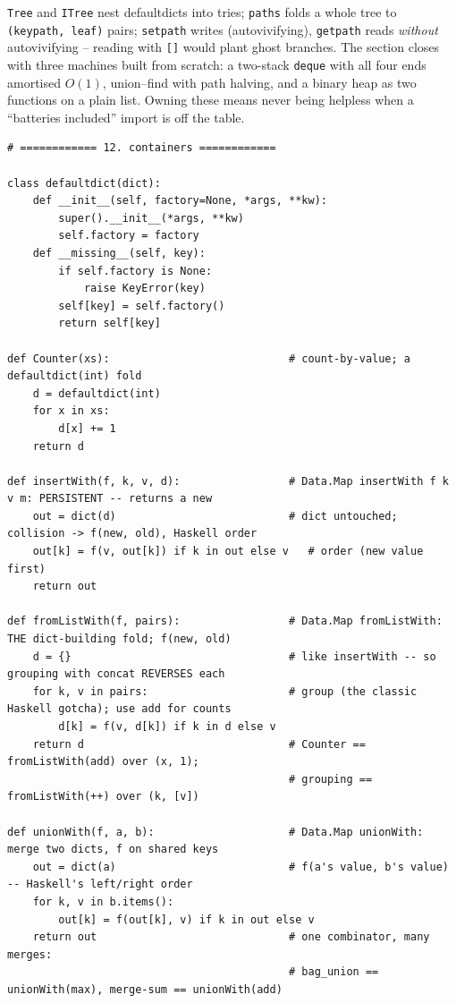 \documentclass[11pt,letterpaper]{book}
\begin{document}
\texttt{Tree} and \texttt{ITree} nest defaultdicts into tries;
\texttt{paths} folds a whole tree to \texttt{(keypath, leaf)} pairs;
\texttt{setpath} writes (autovivifying), \texttt{getpath} reads
\emph{without} autovivifying -- reading with \texttt{[]} would plant ghost
branches. The section closes with three machines built from scratch: a
two-stack \texttt{deque} with all four ends amortised $O(1)$, union--find with
path halving, and a binary heap as two functions on a plain list. Owning these
means never being helpless when a ``batteries included'' import is off the
table.
\begin{lstlisting}[style=code]
# ============ 12. containers ============

class defaultdict(dict):
    def __init__(self, factory=None, *args, **kw):
        super().__init__(*args, **kw)
        self.factory = factory
    def __missing__(self, key):
        if self.factory is None:
            raise KeyError(key)
        self[key] = self.factory()
        return self[key]

def Counter(xs):                            # count-by-value; a defaultdict(int) fold
    d = defaultdict(int)
    for x in xs:
        d[x] += 1
    return d

def insertWith(f, k, v, d):                 # Data.Map insertWith f k v m: PERSISTENT -- returns a new
    out = dict(d)                           # dict untouched; collision -> f(new, old), Haskell order
    out[k] = f(v, out[k]) if k in out else v   # order (new value first)
    return out

def fromListWith(f, pairs):                 # Data.Map fromListWith: THE dict-building fold; f(new, old)
    d = {}                                  # like insertWith -- so grouping with concat REVERSES each
    for k, v in pairs:                      # group (the classic Haskell gotcha); use add for counts
        d[k] = f(v, d[k]) if k in d else v
    return d                                # Counter == fromListWith(add) over (x, 1);
                                            # grouping == fromListWith(++) over (k, [v])

def unionWith(f, a, b):                     # Data.Map unionWith: merge two dicts, f on shared keys
    out = dict(a)                           # f(a's value, b's value) -- Haskell's left/right order
    for k, v in b.items():
        out[k] = f(out[k], v) if k in out else v
    return out                              # one combinator, many merges:
                                            # bag_union == unionWith(max), merge-sum == unionWith(add)


\end{lstlisting}
\end{document}
